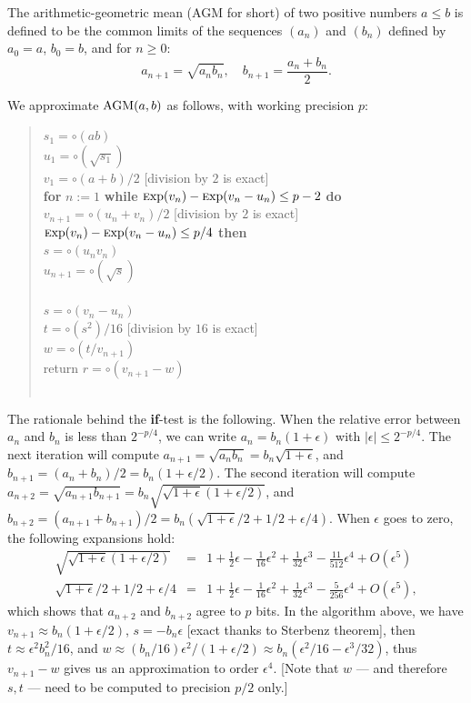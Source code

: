 \documentclass[12pt]{amsart}
\def\q{\hspace*{5mm}}
\def\Exp{{\rm \textsc exp}}
\begin{document}
The arithmetic-geometric mean (AGM for short) of two positive numbers
$a \leq b$ is defined to be the common limits of the sequences
$(a_n)$ and $(b_n)$ defined by $a_0 = a$, $b_0 = b$, and for $n \geq 0$:
\[ a_{n+1} = \sqrt{a_n b_n}, \quad b_{n+1} = \frac{a_n + b_n}{2}. \]

We approximate ${\rm AGM}(a,b)$ as follows, with working precision $p$:
\begin{quote}
$s_1 = \circ(a b)$ \\
$u_1 = \circ(\sqrt{s_1})$ \\
$v_1 = \circ(a + b)/2$ [division by $2$ is exact] \\
{\bf for} $n:=1$ {\bf while} $\Exp(v_n) - \Exp(v_n-u_n) \leq p-2$ {\bf do} \\
\q $v_{n+1} = \circ(u_n + v_n)/2$ [division by $2$ is exact] \\
\q {\bf if} $\Exp(v_n) - \Exp(v_n-u_n) \leq p/4$ {\bf then} \\
\q \q $s = \circ(u_n v_n)$ \\
\q \q $u_{n+1} = \circ(\sqrt{s})$ \\
\q {\bf else} \\
\q \q $s = \circ(v_n - u_n)$ \\
\q \q $t = \circ(s^2)/16$ [division by $16$ is exact] \\
\q \q $w = \circ(t/v_{n+1})$ \\
\q \q return $r = \circ(v_{n+1}-w)$ \\
\q {\bf endif} \\
\end{quote}
The rationale behind the \textbf{if}-test is the following.
When the relative error between $a_n$ and $b_n$ is less than $2^{-p/4}$,
we can write $a_n = b_n (1+\epsilon)$ with $|\epsilon| \leq 2^{-p/4}$.
The next iteration will compute
$a_{n+1} = \sqrt{a_n b_n} = b_n \sqrt{1+\epsilon}$,
and $b_{n+1} = (a_n+b_n)/2 = b_n (1+\epsilon/2)$.
The second iteration will compute $a_{n+2} = \sqrt{a_{n+1} b_{n+1}}
= b_n \sqrt{\sqrt{1+\epsilon} (1+\epsilon/2)}$,
and $b_{n+2} = (a_{n+1}+b_{n+1})/2
= b_n (\sqrt{1+\epsilon}/2 + 1/2 + \epsilon/4)$.
When $\epsilon$ goes to zero, the following expansions hold:
\begin{eqnarray*}
\sqrt{\sqrt{1+\epsilon} (1+\epsilon/2)} & = & 1 + \frac{1}{2} \epsilon
  - \frac{1}{16} \epsilon^2 + \frac{1}{32} \epsilon^3 - \frac{11}{512}
  \epsilon^4 + O(\epsilon^5) \\
\sqrt{1+\epsilon}/2 + 1/2 + \epsilon/4 & = & 1 + \frac{1}{2} \epsilon
  - \frac{1}{16} \epsilon^2 + \frac{1}{32} \epsilon^3 - \frac{5}{256}
  \epsilon^4 + O(\epsilon^5),
\end{eqnarray*}
which shows that $a_{n+2}$ and $b_{n+2}$ agree to $p$ bits.
In the algorithm above, we have $v_{n+1} \approx b_n (1+\epsilon/2)$,
$s = -b_n \epsilon$ [exact thanks to Sterbenz theorem],
then $t \approx \epsilon^2 b_n^2/16$,
and $w \approx (b_n/16) \epsilon^2/(1+\epsilon/2) \approx
b_n (\epsilon^2/16 - \epsilon^3/32)$,
thus $v_{n+1}-w$ gives us an approximation to order $\epsilon^4$.
[Note that $w$ --- and therefore $s, t$ ---
need to be computed to precision $p/2$ only.]
\end{document}
